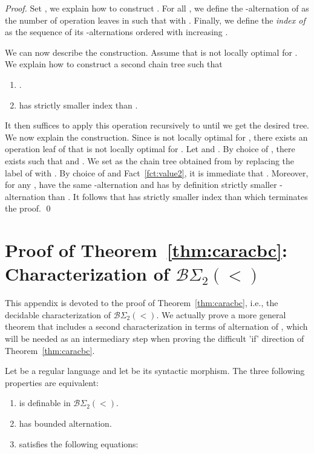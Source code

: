 \documentclass[envcountsame]{llncs}
\newcommand{\bswd}{\ensuremath{\mathcal{B}\Sigma_{2}(<)}\xspace}
\newcommand\chain{chain\xspace}
\begin{document}
\begin{proof}
  Set , we explain how to construct . For all
  , we define the -alternation of  as the number of
  operation leaves  in  such that 
  with . Finally, we define the \emph{index of } as
  the sequence of its -alternations ordered with increasing .

  We can now describe the construction. Assume that  is not locally
  optimal for . We explain how to construct a second \chain tree
   such that
  \begin{enumerate}
  \item .
  \item  has strictly smaller index than .
  \end{enumerate}
  It then suffices to apply this operation recursively to  until we
  get the desired tree. We now explain the construction. Since  is
  not locally optimal for , there exists an operation leaf 
  of  that is not locally optimal for . Let
   and
  . By choice of
  , there exists  such that  and
  . We set  as 
  the \chain tree obtained from  by replacing the label of  with
  . By choice of  and
  Fact~\ref{fct:value2}, it is immediate that . Moreover, for any ,  have the
  same -alternation and  has by definition strictly smaller
  -alternation than . It follows that  has strictly smaller
  index than  which terminates the proof. \qed
\end{proof} 

\section{Proof of Theorem~\ref{thm:caracbc}: Characterization of \bswd}
\label{app:bc}
This appendix is devoted to the proof of Theorem~\ref{thm:caracbc},
i.e., the decidable characterization of \bswd. We actually prove a
more general theorem that includes a second characterization in terms
of alternation of , which will be needed as an
intermediary step when proving the difficult 'if' direction of
Theorem~\ref{thm:caracbc}.

\begin{theorem} \label{thm:caracbc2}
  Let  be a regular language and let  be its
  syntactic morphism. The three following properties are equivalent:

  \begin{enumerate}
  \item  is definable in \bswd.
  \item  has bounded alternation.
  \item  satisfies the following equations:

    

    
  \end{enumerate}
\end{theorem}
\end{document}

